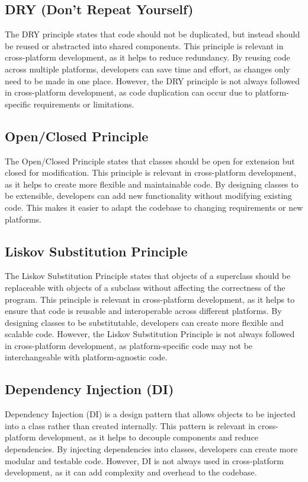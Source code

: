 \subsection{DRY (Don't Repeat Yourself)}
The DRY principle states that code should not be duplicated, but instead should be reused or abstracted into shared components.
This principle is relevant in cross-platform development, as it helps to reduce redundancy.
By reusing code across multiple platforms, developers can save time and effort, as changes only need to be made in one place.
However, the DRY principle is not always followed in cross-platform development, as code duplication can occur due to platform-specific requirements or limitations.

\subsection{Open/Closed Principle}
The Open/Closed Principle states that classes should be open for extension but closed for modification.
This principle is relevant in cross-platform development, as it helps to create more flexible and maintainable code.
By designing classes to be extensible, developers can add new functionality without modifying existing code.
This makes it easier to adapt the codebase to changing requirements or new platforms.

\subsection{Liskov Substitution Principle}
The Liskov Substitution Principle states that objects of a superclass should be replaceable with objects of a subclass without affecting the correctness of the program.
This principle is relevant in cross-platform development, as it helps to ensure that code is reusable and interoperable across different platforms.
By designing classes to be substitutable, developers can create more flexible and scalable code.
However, the Liskov Substitution Principle is not always followed in cross-platform development, as platform-specific code may not be interchangeable with platform-agnostic code.

\subsection{Dependency Injection (DI)}
Dependency Injection (DI) is a design pattern that allows objects to be injected into a class rather than created internally.
This pattern is relevant in cross-platform development, as it helps to decouple components and reduce dependencies.
By injecting dependencies into classes, developers can create more modular and testable code.
However, DI is not always used in cross-platform development, as it can add complexity and overhead to the codebase.

